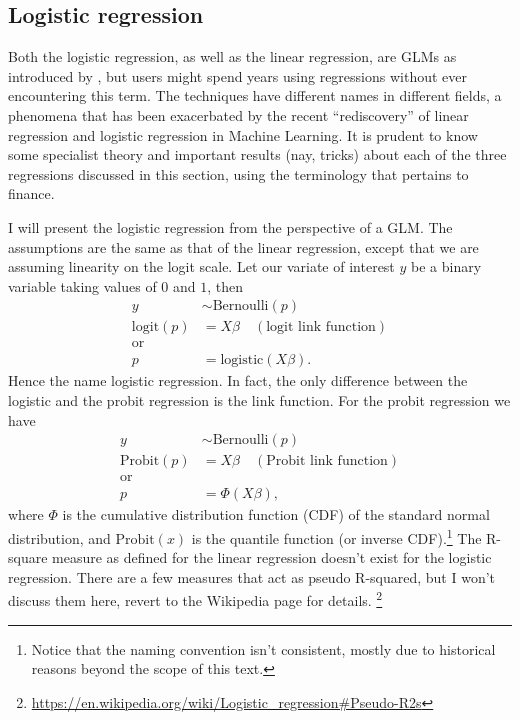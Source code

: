 \documentclass[a4paper]{article}
\begin{document}
\subsection{Logistic regression}
Both the logistic regression, as well as the linear regression, are GLMs as introduced by \citet{GLM}, but users might spend years using regressions without ever encountering this term.
The techniques have different names in different fields, a phenomena that has been exacerbated by the recent ``rediscovery'' of linear regression and logistic regression in Machine Learning.
It is prudent to know some specialist theory and important results (nay, tricks) about each of the three regressions discussed in this section, using the terminology that pertains to finance.

I will present the logistic regression from the perspective of a GLM.
The assumptions are the same as that of the linear regression, except that we are assuming linearity on the logit scale.
Let our variate of interest $y$ be a binary variable taking values of $0$ and $1$, then
\begin{align*}
y &\sim \text{Bernoulli}(p) \\
\text{logit}(p) &= X\beta  \quad (\text{logit link function})\\
\text{or}& \\
p &= \text{logistic}(X\beta)
\text{.}
\end{align*}
Hence the name logistic regression.
In fact, the only difference between the logistic and the probit regression is the link function.
For the probit regression we have
\begin{align*}
y &\sim \text{Bernoulli}(p) \\
\text{Probit}(p) &= X\beta  \quad (\text{Probit link function})\\
\text{or}& \\
p &= \Phi(X\beta)
\text{,}
\end{align*}
where $\Phi$ is the cumulative distribution function (CDF) of the standard normal distribution, and   $\text{Probit}(x)$ is the quantile function (or inverse CDF).\footnote{Notice that the naming convention isn't consistent, mostly due to historical reasons beyond the scope of this text.}
The R-square measure as defined for the linear regression doesn't exist for the logistic regression.
There are a few measures that act as pseudo R-squared, but I won't discuss them here, revert to the Wikipedia page for details.%
\footnote{\url{https://en.wikipedia.org/wiki/Logistic_regression\#Pseudo-R2s}}
\end{document}
